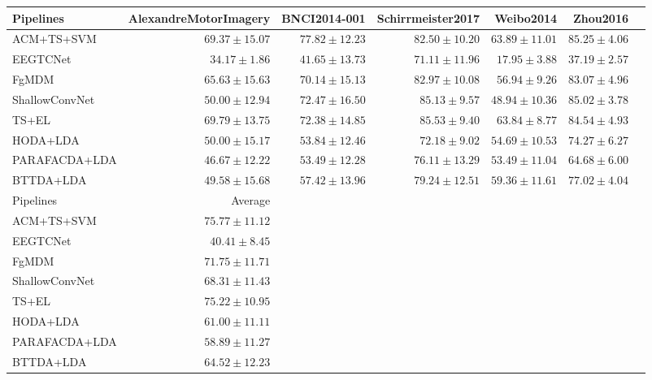 \begin{tabular}{@{}lrrrrrr@{}}
\toprule
Pipelines & AlexandreMotorImagery & BNCI2014-001 & Schirrmeister2017 & Weibo2014 & Zhou2016 \\
\midrule
ACM+TS+SVM & $69.37\pm15.07$ & \boldmath$77.82\pm12.23$ & $82.50\pm10.20$ & \boldmath$63.89\pm11.01$ & \boldmath$85.25\pm4.06$ \\
EEGTCNet & $34.17\pm1.86$ & $41.65\pm13.73$ & $71.11\pm11.96$ & $17.95\pm3.88$ & $37.19\pm2.57$ \\
FgMDM & $65.63\pm15.63$ & $70.14\pm15.13$ & $82.97\pm10.08$ & $56.94\pm9.26$ & $83.07\pm4.96$ \\
ShallowConvNet & $50.00\pm12.94$ & $72.47\pm16.50$ & $85.13\pm9.57$ & $48.94\pm10.36$ & $85.02\pm3.78$ \\
TS+EL & \boldmath$69.79\pm13.75$ & $72.38\pm14.85$ & \boldmath$85.53\pm9.40$ & $63.84\pm8.77$ & $84.54\pm4.93$ \\HODA+LDA & $50.00\pm15.17$ & $53.84\pm12.46$ & $72.18\pm9.02$ & $54.69\pm10.53$ & $74.27\pm6.27$ \\
PARAFACDA+LDA & $46.67\pm12.22$ & $53.49\pm12.28$ & $76.11\pm13.29$ & $53.49\pm11.04$ & $64.68\pm6.00$ \\
BTTDA+LDA & $49.58\pm15.68$ & $57.42\pm13.96$ & $79.24\pm12.51$ & $59.36\pm11.61$ & $77.02\pm4.04$ \\
\midrule 
Pipelines & Average \\
\midrule
ACM+TS+SVM & \boldmath$75.77\pm11.12$ \\
EEGTCNet & $40.41\pm8.45$ \\
FgMDM & $71.75\pm11.71$ \\
ShallowConvNet & $68.31\pm11.43$ \\
TS+EL & $75.22\pm10.95$ \\HODA+LDA & $61.00\pm11.11$ \\
PARAFACDA+LDA & $58.89\pm11.27$ \\
BTTDA+LDA & $64.52\pm12.23$ \\
\bottomrule
\end{tabular}


